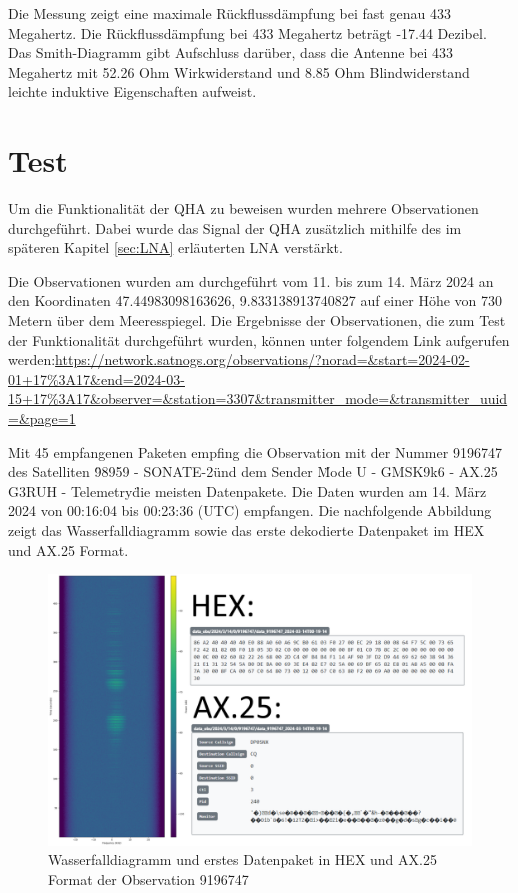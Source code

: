 Die Messung zeigt eine maximale Rückflussdämpfung bei fast genau 433 Megahertz. Die Rückflussdämpfung bei 433 Megahertz beträgt -17.44 Dezibel. Das Smith-Diagramm gibt Aufschluss darüber, dass die Antenne bei 433 Megahertz mit 52.26 Ohm Wirkwiderstand und 8.85 Ohm Blindwiderstand leichte induktive Eigenschaften aufweist.

\section{Test}
Um die Funktionalität der QHA zu beweisen wurden mehrere Observationen durchgeführt. Dabei wurde das Signal der QHA zusätzlich mithilfe des im späteren Kapitel \ref{sec:LNA} erläuterten LNA verstärkt.

Die Observationen wurden am durchgeführt vom 11. bis zum 14. März 2024 an den Koordinaten 47.44983098163626, 9.833138913740827 auf einer Höhe von 730 Metern über dem Meeresspiegel.  Die Ergebnisse der Observationen, die zum Test der Funktionalität durchgeführt wurden, können unter folgendem Link aufgerufen werden:\newline \url{https://network.satnogs.org/observations/?norad=&start=2024-02-01+17%3A17&end=2024-03-15+17%3A17&observer=&station=3307&transmitter_mode=&transmitter_uuid=&page=1}

Mit 45 empfangenen Paketen empfing die Observation mit der Nummer 9196747 des Satelliten \"98959 - SONATE-2\" und dem Sender \"Mode U - GMSK9k6 - AX.25 G3RUH - Telemetry\" die meisten Datenpakete. Die Daten wurden am 14. März 2024 von 00:16:04 bis 00:23:36 (UTC) empfangen. Die nachfolgende Abbildung zeigt das Wasserfalldiagramm sowie das erste dekodierte Datenpaket im HEX und AX.25 Format.

\begin{figure} [H]
	\centering
	\includegraphics[width=\linewidth]{../ref/qha_successfull_operation.png}
	\caption{Wasserfalldiagramm und erstes Datenpaket in HEX und AX.25 Format der Observation 9196747 \cite{noauthor_satnogs_qfh_observation_nodate}}
	\label{fig:qha_successfull_observation}
\end{figure}



